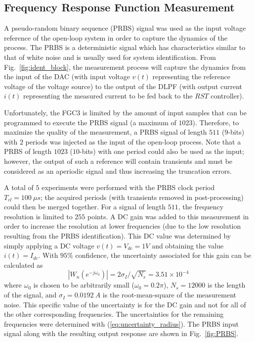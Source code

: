 \documentclass[journal]{IEEEtran}
\begin{document}
\subsection{Frequency Response Function Measurement}
A pseudo-random binary sequence (PRBS) signal was used as the input voltage reference of the open-loop system in order to capture the dynamics of the process. The PRBS is a deterministic signal which has characteristics similar to that of white noise and is usually used for system identification. From Fig.~\ref{fig:ident_block}, the measurement process will capture the dynamics from the input of the DAC (with input voltage $v(t)$ representing the reference voltage of the voltage source) to the output of the DLPF (with output current $i(t)$ representing the measured current to be fed back to the $RST$ controller). 

Unfortunately, the FGC3 is limited by the amount of input samples that can be programmed to execute the PRBS signal (a maximum of $1023$). Therefore, to maximize the quality of the measurement, a PRBS signal of length $511$ ($9$-bits) with $2$ periods was injected as the input of the open-loop process. Note that a PRBS of length $1023$ ($10$-bits) with one period could also be used as the input; however, the output of such a reference will contain transients and must be considered as an aperiodic signal and thus increasing the truncation errors. 

A total of $5$ experiments were performed with the PRBS clock period $T_{cl} = 100 \: \mu s$; the acquired periods (with transients removed in post-processing) could then be merged together. For a signal of length $511$, the frequency resolution is limited to $255$ points. A DC gain was added to this measurement in order to increase the resolution at lower frequencies (due to the low resolution resulting from the PRBS identification). This DC value was determined by simply applying a DC voltage $v(t) = V_{dc} = 1V$ and obtaining the value $i(t) = I_{dc}$. With $95\%$ confidence, the uncertainty associated for this gain can be calculated as 
$$|W_n(e^{-j\omega_0})| = 2\sigma_I / \sqrt{N_s} = 3.51 \times10^{-4}$$ 
where $\omega_0$ is chosen to be arbitrarily small ($\omega_0 = 0.2\pi$), $N_s = 12000$ is the length of the signal, and $\sigma_I = 0.0192 \: A$ is the root-mean-square of the measurement noise. This specific value of the uncertainty is for the DC gain and not for all of the other corresponding frequencies. The uncertainties for the remaining frequencies were determined with (\ref{eq:uncertainty_radius}). The PRBS input signal along with the resulting output response are shown in Fig.~\ref{fig:PRBS}. 
\end{document}
